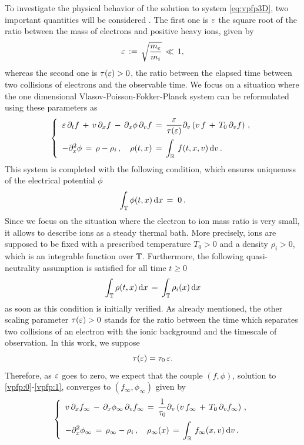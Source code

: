 \documentclass[11pt]{amsart}
\numberwithin{equation}{section}
\numberwithin{figure}{section}
\begin{document}
  To investigate the physical behavior of the solution to  system
  \eqref{eq:vpfp3D},  two important quantities will be considered \cite{FN:22}.  The
  first one is $\varepsilon$ the square root of the ratio between the mass
  of electrons and positive heavy ions, given by
  $$
  \varepsilon \,:=\, \sqrt{\frac{m_e}{m_i}}\,\ll\, 1,
  $$
whereas the second one is $\tau(\varepsilon)>0$, the ratio between the elapsed time
between two collisions of electrons and the observable time. We focus on a situation where the  one dimensional Vlasov-Poisson-Fokker-Planck system can be reformulated using
these parameters as
\begin{equation}
	\label{vpfp:0}
	\left\{
	\begin{array}{l}
		\displaystyle\varepsilon\,\partial_t f \,+\, v\,\partial_x f
		\,-\,\partial_{x}\phi \,\partial_v f \,=\,\frac{\varepsilon}{\tau(\varepsilon)}
		\partial_v \left( v \, f \,+\, T_0\,\partial_v f \right)\,,
		\\[1.1em]
		\displaystyle-\partial_{x}^2\phi \,=\, \rho-\rho_i\,,\quad \rho(t,x)\,=\,\int_{{\mathbb R}}\,f(t,x,v)\,\mathrm{d} v\,.
	\end{array}\right.
\end{equation}
This system is completed with the following condition, which ensures uniqueness of the electrical potential $\phi$
\begin{equation}
	\label{vpfp:1}
	\int_{\mathbb T} \phi(t,x) \,\mathrm{d} x\,=\; 0\,.
\end{equation}
Since we focus on the situation where the electron to ion mass ratio
is very small, it allows to describe ions as a steady thermal bath. More precisely, ions are
supposed to be fixed with a prescribed temperature $T_0>0$ and a density
$\rho_i>0$, which is an integrable function over
${\mathbb T}$. Furthermore, the following quasi-neutrality assumption is satisfied for all time $t\geq0$
$$
\int_{{\mathbb T}} \rho(t,x)\,\mathrm{d} x \,=\,  \int_{{\mathbb T}} \rho_i(x)\,\mathrm{d} x 
$$
as soon as this condition is initially verified.
As already mentioned, the other scaling parameter $\tau(\varepsilon)>0$ stands for the ratio between the time which
separates two collisions of an electron with the ionic background and the timescale of observation. In this work, we suppose
$$
\tau(\varepsilon)=\tau_0\,\varepsilon.
$$
Therefore, as $\varepsilon$ goes to zero, we expect that the couple  $(f,\phi)$,
solution to \eqref{vpfp:0}-\eqref{vpfp:1}, converges to $(f_\infty,\phi_\infty)$ given by
\begin{equation*}
	\left\{
	\begin{array}{l}
		\displaystyle v\,\partial_x f_{\infty}
		\,-\,\partial_{x}\phi_{\infty} \,\partial_v f_{\infty} \,=\,\frac{1}{\tau_0}
		\partial_v \left( v \, f_{\infty} \,+\, T_0\,\partial_v f_{\infty} \right)\,,
		\\[1.1em]
		\displaystyle-\partial_{x}^2\phi_{\infty} \,=\, \rho_{\infty}-\rho_i\,,\quad \rho_{\infty}(x)\,=\,\int_{{\mathbb R}}\,f_{\infty}(x,v)\,\mathrm{d} v\,.
	\end{array}\right.
\end{equation*}
\end{document}

